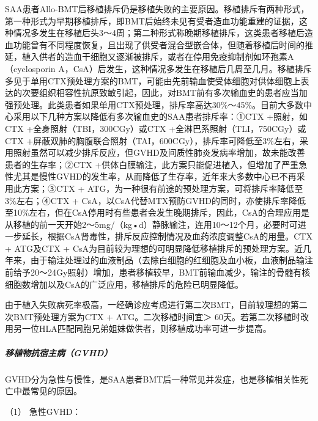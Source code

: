 SAA患者Allo-BMT后移植排斥仍是移植失败的主要原因。移植排斥有两种形式，第一种形式为早期移植排斥，即BMT后始终未见有受者造血功能重建的证据，这种情况多发生在移植后头3～4周；第二种形式称晚期移植排斥，这类患者移植后造血功能曾有不同程度恢复，且出现了供受者混合型嵌合体，但随着移植后时间的推延，植入供者的造血干细胞又逐渐被排斥，或者在停用免疫抑制剂如环孢素A（cyclosporin
A，CsA）后发生，这种情况多发生在移植后几周至几月。移植排斥多见于单用CTX预处理方案的BMT，可能由先前输血使受体细胞对供体细胞上表达的次要组织相容性抗原致敏引起，因此，对BMT前有多次输血史的患者应当加强预处理。此类患者如果单用CTX预处理，排斥率高达30\%～45\%。目前大多数中心采用以下几种方案以降低有多次输血史的SAA患者排斥率：①CTX
+照射，如CTX +全身照射（TBI，300CGy）或CTX
+全淋巴系照射（TLI，750CGy）或CTX
+屏蔽双肺的胸腹联合照射（TAI，600CGy），排斥率可降低至3\%左右，采用照射虽然可以减少排斥反应，但GVHD及间质性肺炎发病率增加，故未能改善患者的生存率；②CTX
+供体白膜输注，此方案只能促进植入，但增加了严重急性尤其是慢性GVHD的发生率，从而降低了生存率，近年来大多数中心已不再采用此方案；③CTX
+ ATG，为一种很有前途的预处理方案，可将排斥率降低至3\%左右；④CTX +
CsA，以CsA代替MTX预防GVHD的同时，亦使排斥率降低至10\%左右，但在CsA停用时有些患者会发生晚期排斥，因此，CsA的合理应用是从移植的前一天开始2～5mg/（kg•d）静脉输注，连用10～12个月，必要时可进一步延长，根据CsA肾毒性，排斥反应控制情况及血药浓度调整CsA的用量。CTX
+ ATG及CTX +
CsA为目前较为理想的可明显降低移植排斥的预处理方案。近几年来，由于输注处理过的血液制品（去除白细胞的红细胞及血小板，血液制品输注前给予20～24Gy照射）增加，患者移植较早，BMT前输血减少，输注的骨髓有核细胞数增加以及CsA的广泛应用，移植排斥的危险已明显降低。

由于植入失败病死率极高，一经确诊应考虑进行第二次BMT，目前较理想的第二次BMT预处理方案为CTX
+ ATG。二次移植时间宜＞
60天。若第二次移植时改用另一位HLA匹配同胞兄弟姐妹做供者，则移植成功率可进一步提高。

\subparagraph{移植物抗宿主病（GVHD）}


GVHD分为急性与慢性，是SAA患者BMT后一种常见并发症，也是移植相关性死亡中最常见的原因。

\hypertarget{text00089.htmlux5cux23CHP3-10-1-3-2-7-2-1}{}
（1） 急性GVHD：

